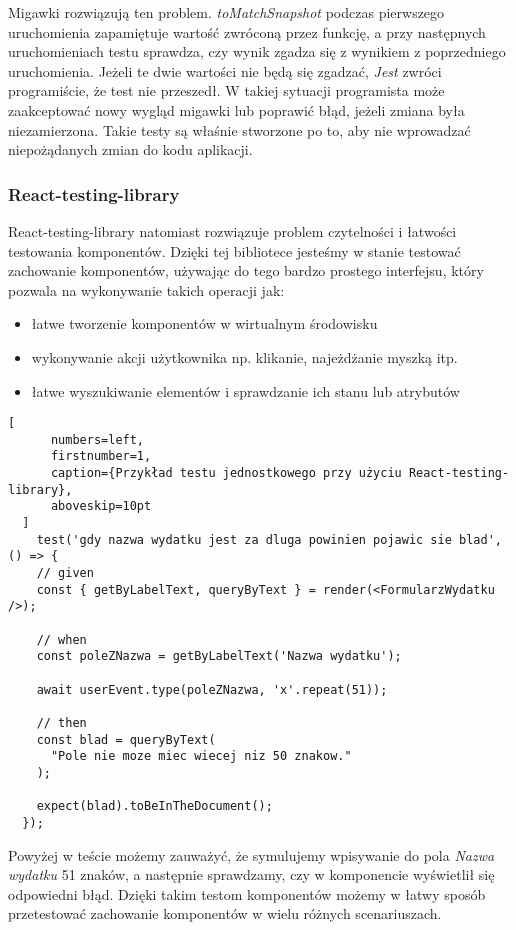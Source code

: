 \begin{description}
  Migawki rozwiązują ten problem. \emph{toMatchSnapshot} podczas pierwszego uruchomienia zapamiętuje wartość zwróconą przez funkcję, a przy następnych uruchomieniach testu sprawdza, czy wynik zgadza się z wynikiem z poprzedniego uruchomienia. Jeżeli te dwie wartości nie będą się zgadzać, \emph{Jest} zwróci programiście, że test nie przeszedł. W takiej sytuacji programista może zaakceptować nowy wygląd migawki lub poprawić błąd, jeżeli zmiana była niezamierzona. Takie testy są właśnie stworzone po to, aby nie wprowadzać niepożądanych zmian do kodu aplikacji.

\subsubsection{React-testing-library} React-testing-library natomiast rozwiązuje problem czytelności i łatwości testowania komponentów. Dzięki tej bibliotece jesteśmy w stanie testować zachowanie komponentów, używając do tego bardzo prostego interfejsu, który pozwala na wykonywanie takich operacji jak:
\begin{itemize}
  \item łatwe tworzenie komponentów w wirtualnym środowisku
  \item wykonywanie akcji użytkownika np. klikanie, najeżdżanie myszką itp.
  \item łatwe wyszukiwanie elementów i sprawdzanie ich stanu lub atrybutów
\end{itemize}


\end{description}
  \begin{addmargin}[6mm]{0mm}
  \begin{lstlisting}[
      numbers=left,
      firstnumber=1,
      caption={Przykład testu jednostkowego przy użyciu React-testing-library},
      aboveskip=10pt
  ]
    test('gdy nazwa wydatku jest za dluga powinien pojawic sie blad', () => {
    // given
    const { getByLabelText, queryByText } = render(<FormularzWydatku />);

    // when
    const poleZNazwa = getByLabelText('Nazwa wydatku');

    await userEvent.type(poleZNazwa, 'x'.repeat(51));

    // then
    const blad = queryByText(
      "Pole nie moze miec wiecej niz 50 znakow."
    );

    expect(blad).toBeInTheDocument();
  });
  \end{lstlisting}
  \end{addmargin}
  Powyżej w teście możemy zauważyć, że symulujemy wpisywanie do pola \emph{Nazwa wydatku} 51 znaków, a następnie sprawdzamy, czy w komponencie wyświetlił się odpowiedni błąd. Dzięki takim testom komponentów możemy w łatwy sposób przetestować zachowanie komponentów w wielu różnych scenariuszach.

